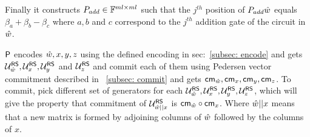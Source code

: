 Finally it constructs $P_{add} \in \mathbb{F}^{ml \times ml}$ such that the $j^{th}$ position of $P_{add} \hat{w}$ equals $\beta_a + \beta_b - \beta_c$ where $a, b$ and $c$ correspond to the $j^{th}$ addition gate of the circuit in $\hat{w}$.

$\mathsf{P}$ encodes $\hat{w} , x, y , z$ using the defined encoding in sec:~\ref{subsec: encode} and gets $\mathcal{U}^{\mathsf{RS}}_{\hat{w}}, \mathcal{U}^{\mathsf{RS}}_x, \mathcal{U}^{\mathsf{RS}}_y$ and $\mathcal{U}^{\mathsf{RS}}_z$ and commit each of them using Pedersen vector commitment described in ~\ref{subsec: commit} and gets $\mathsf{cm}_{\hat{w}}, \mathsf{cm}_x, \mathsf{cm}_y, \mathsf{cm}_z$. To commit, pick different set of generators for each $\mathcal{U}^{\mathsf{RS}}_{\hat{w}}, \mathcal{U}^{\mathsf{RS}}_x, \mathcal{U}^{\mathsf{RS}}_y, \mathcal{U}^{\mathsf{RS}}_z$, which will give the property that commitment of $\mathcal{U}^{\mathsf{RS}}_{\hat{w}||x}$ is $\mathsf{cm}_{\hat{w}} \circ \mathsf{cm}_x$. Where $\hat{w}||x$ means that a new matrix is formed by adjoining columns of $\hat{w}$ followed by the columns of $x$. 


